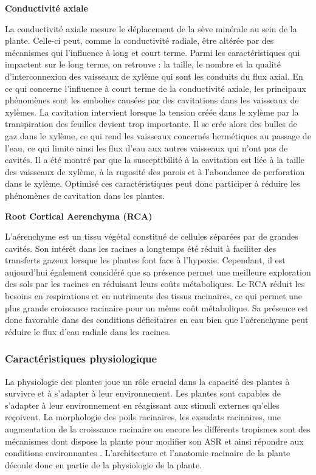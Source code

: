 \noindent \textbf{Conductivité axiale}

La conductivité axiale mesure le déplacement de la sève minérale au sein de la plante.
Celle-ci peut, comme la conductivité radiale, être altérée par des mécanismes qui l'influence à long et court terme.
Parmi les caractéristiques qui impactent sur le long terme, on retrouve : la taille, le nombre et la qualité d'interconnexion des vaisseaux de xylème qui sont les conduits du flux axial.
En ce qui concerne l'influence à court terme de la conductivité axiale, les principaux phénomènes sont les embolies causées par des cavitations dans les vaisseaux de xylèmes.
La cavitation intervient lorsque la tension créée dans le xylème par la transpiration des feuilles devient trop importante.
Il se crée alors des bulles de gaz dans le xylème, ce qui rend les vaisseaux concernés hermétiques au passage de l'eau, ce qui limite ainsi les flux d'eau aux autres vaisseaux qui n'ont pas de cavités.
Il a été montré par \cite{delzon_mechanism_2010} que la susceptibilité à la cavitation est liée à la taille des vaisseaux de xylème, à la rugosité des parois et à l'abondance de perforation dans le xylème.
Optimisé ces caractéristiques peut donc participer à réduire les phénomènes de cavitation dans les plantes.
\newline

\noindent \textbf{Root Cortical Aerenchyma (RCA)}

L'aérenchyme est un tissu végétal constitué de cellules séparées par de grandes cavités.
Son intérêt dans les racines a longtemps été réduit à faciliter des transferts gazeux lorsque les plantes font face à l'hypoxie.
Cependant, il est aujourd'hui également considéré que sa présence permet une meilleure exploration des sols par les racines en réduisant leurs coûts métaboliques.
Le RCA réduit les besoins en respirations et en nutriments des tissus racinaires, ce qui permet une plus grande croissance racinaire pour un même coût métabolique.
Sa présence est donc favorable dans des conditions déficitaires en eau bien que l'aérenchyme peut réduire le flux d'eau radiale dans les racines.


\subsubsection{Caractéristiques physiologique}

La physiologie des plantes joue un rôle crucial dans la capacité des plantes à survivre et à s'adapter à leur environnement.
Les plantes sont capables de s'adapter à leur environnement en réagissant aux stimuli externes qu'elles reçoivent.
La morphologie des poils racinaires, les exsudats racinaires, une augmentation de la croissance racinaire ou encore les différents tropismes sont des mécanismes dont dispose la plante pour modifier son ASR et ainsi répondre aux conditions environnantes \citep{dunbabin_modelling_2013}.
L'architecture et l'anatomie racinaire de la plante découle donc en partie de la physiologie de la plante.
\newline

